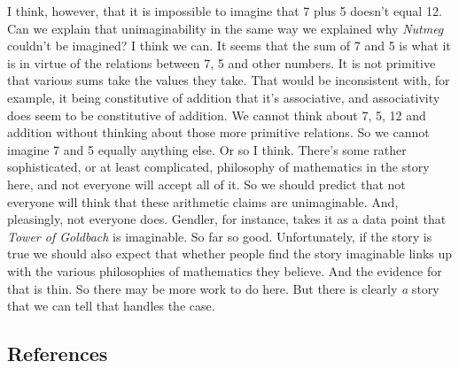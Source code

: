 \documentclass[
  10pt,
  letterpaper,
  DIV=11,
  numbers=noendperiod,
  twoside]{scrartcl}
\begin{document}
I think, however, that it is impossible to imagine that 7 plus 5 doesn't
equal 12. Can we explain that unimaginability in the same way we
explained why \emph{Nutmeg} couldn't be imagined? I think we can. It
seems that the sum of 7 and 5 is what it is in virtue of the relations
between 7, 5 and other numbers. It is not primitive that various sums
take the values they take. That would be inconsistent with, for example,
it being constitutive of addition that it's associative, and
associativity does seem to be constitutive of addition. We cannot think
about 7, 5, 12 and addition without thinking about those more primitive
relations. So we cannot imagine 7 and 5 equally anything else. Or so I
think. There's some rather sophisticated, or at least complicated,
philosophy of mathematics in the story here, and not everyone will
accept all of it. So we should predict that not everyone will think that
these arithmetic claims are unimaginable. And, pleasingly, not everyone
does. Gendler, for instance, takes it as a data point that \emph{Tower
of Goldbach} is imaginable. So far so good. Unfortunately, if the story
is true we should also expect that whether people find the story
imaginable links up with the various philosophies of mathematics they
believe. And the evidence for that is thin. So there may be more work to
do here. But there is clearly \emph{a} story that we can tell that
handles the case.

\subsection*{References}\label{references}
\end{document}
